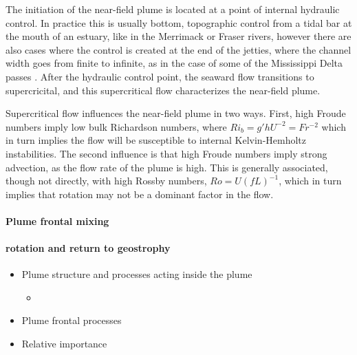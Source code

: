 \documentclass[12pt]{article}
\begin{document}
The initiation of the near-field plume is located at a point of internal hydraulic control. In practice this is usually bottom, topographic control from a tidal bar at the mouth of an estuary, like in the Merrimack \citep{macdonald.ea:07} or Fraser \citep{macdonald.geyer:05} rivers, however there are also cases where the control is created at the end of the jetties, where the channel width goes from finite to infinite, as in the case of some of the Mississippi Delta passes \citep{wright.coleman:71}. After the hydraulic control point, the seaward flow transitions to supercricital, and this supercritical flow characterizes the near-field plume.

Supercritical flow influences the near-field plume in two ways. First, high Froude numbers imply low bulk Richardson numbers, where $Ri_b = g' h U^{-2} = Fr^{-2}$ which in turn implies the flow will be susceptible to internal Kelvin-Hemholtz instabilities. The second influence is that high Froude numbers imply strong advection, as the flow rate of the plume is high. This is generally associated, though not directly, with high Rossby numbers, $Ro = U (f L)^{-1}$, which in turn implies that rotation may not be a dominant factor in the flow. 


\paragraph{Plume frontal mixing}

\paragraph{rotation and return to geostrophy}

\begin{itemize}
  \item Plume structure and processes acting inside the plume
  \begin{itemize}
    \item 
  \end{itemize}
  \item Plume frontal processes
  \item Relative importance
\end{itemize}
\end{document}
